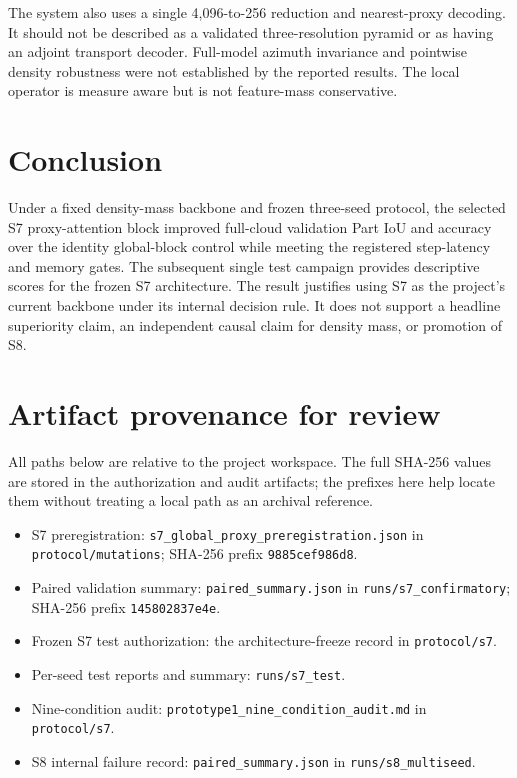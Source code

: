 \documentclass[11pt,a4paper]{article}
\begin{document}
The system also uses a single 4,096-to-256 reduction and nearest-proxy decoding. It should not be described as a validated three-resolution pyramid or as having an adjoint transport decoder. Full-model azimuth invariance and pointwise density robustness were not established by the reported results. The local operator is measure aware but is not feature-mass conservative.

\section{Conclusion}

Under a fixed density-mass backbone and frozen three-seed protocol, the selected S7 proxy-attention block improved full-cloud validation Part IoU and accuracy over the identity global-block control while meeting the registered step-latency and memory gates. The subsequent single test campaign provides descriptive scores for the frozen S7 architecture. The result justifies using S7 as the project's current backbone under its internal decision rule. It does not support a headline superiority claim, an independent causal claim for density mass, or promotion of S8.

\appendix
\section{Artifact provenance for review}

All paths below are relative to the project workspace. The full SHA-256 values are stored in the authorization and audit artifacts; the prefixes here help locate them without treating a local path as an archival reference.
\begin{itemize}
\item S7 preregistration: \texttt{s7\_global\_proxy\_preregistration.json} in \texttt{protocol/mutations}; SHA-256 prefix \texttt{9885cef986d8}.
\item Paired validation summary: \texttt{paired\_summary.json} in \texttt{runs/s7\_confirmatory}; SHA-256 prefix \texttt{145802837e4e}.
\item Frozen S7 test authorization: the architecture-freeze record in \texttt{protocol/s7}.
\item Per-seed test reports and summary: \texttt{runs/s7\_test}.
\item Nine-condition audit: \texttt{prototype1\_nine\_condition\_audit.md} in \texttt{protocol/s7}.
\item S8 internal failure record: \texttt{paired\_summary.json} in \texttt{runs/s8\_multiseed}.
\end{itemize}
\end{document}
